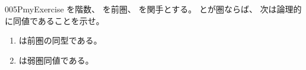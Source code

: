 \documentclass[index]{subfiles}
\begin{document}
\begin{myBlock}{005P}{myExercise}
  を階数、
  を前圏、
  を関手とする。
  とが圏ならば、
  次は論理的に同値であることを示せ。
  \begin{enumerate}
  \item \label{005P:0000} は前圏の同型である。
  \item \label{005P:0001} は弱圏同値である。
  \end{enumerate}
\end{myBlock}
\end{document}

